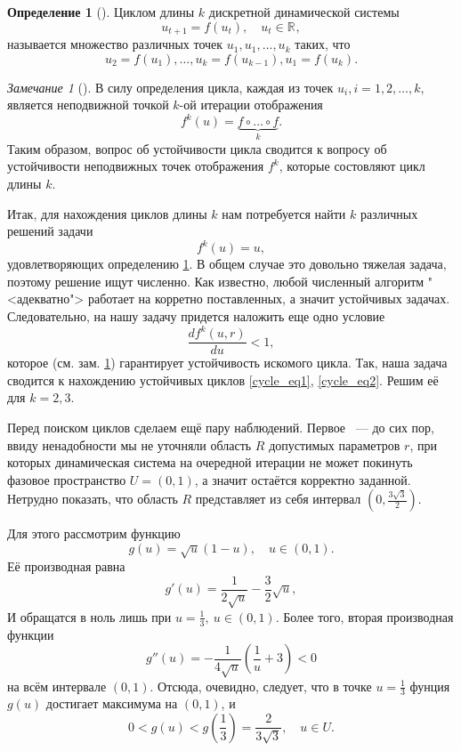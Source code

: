 \documentclass[oneside,final,12pt]{article}
\newcommand*\Rn  [1]{\mathbb{R}^{#1}}
\newcommand*\inter[2]{(#1,#2)}
\theoremstyle{plain}
\theoremstyle{remark}
\newtheorem*{remark}{Замечание}
\theoremstyle{definition}
\newtheorem{definition}{Определение}
\theoremstyle{plain}
\begin{document}
	\begin{definition}[\cite{DSMB}]\label{cycle}
		Циклом длины \(k\) дискретной динамической системы
		\[u_{t+1} = f(u_t), \quad u_t \in \Rn{},\]
		называется множество различных точек \(u_1, u_1, \ldots, u_k \) таких, что 
		\[u_2 = f(u_1), \ldots, u_k = f(u_{k-1}), u_1 = f(u_k).\] 
	\end{definition}
	\begin{remark}[\cite{DSMB}]\label{stable}
		В силу определения цикла, каждая из точек \(u_i, i = 1,2,\ldots,k\), является неподвижной точкой \(k\)-ой итерации отображения 
		\[f^k(u) = \underbrace{f \circ \ldots \circ f}_{k}.\]
		Таким образом, вопрос об устойчивости цикла сводится к вопросу об устойчивости неподвижных точек отображения \(f^k\), которые состовляют цикл длины \(k\).
	\end{remark}
	
	Итак, для нахождения циклов длины \(k\) нам потребуется найти \(k\) различных решений задачи
	\begin{equation} f^k(u) = u, \label{cycle_eq1} \end{equation}
	удовлетворяющих определению \ref{cycle}. В общем случае это довольно тяжелая задача, поэтому решение ищут численно. Как известно, любой численный алгоритм "<адекватно"> работает на корретно поставленных, а значит устойчивых задачах. Следовательно, на нашу задачу придется наложить еще одно условие
	\begin{equation} \frac{df^k(u,r)}{du} < 1,\label{cycle_eq2} \end{equation}
которое (см. зам. \ref{stable}) гарантирует устойчивость искомого цикла. Так, наша задача сводится к нахождению устойчивых циклов \eqref{cycle_eq1}, \eqref{cycle_eq2}. Решим её для \(k = 2,3\).

	\bigskip
	Перед поиском циклов сделаем ещё пару наблюдений. Первое ~--- до сих пор, ввиду ненадобности мы не уточняли область \(R\) допустимых параметров \(r\),  при которых динамическая система на очередной итерации не может покинуть фазовое пространство \(U = \inter{0}{1} \), а значит остаётся корректно заданной. Нетрудно показать, что область \(R\) представляет из себя интервал \(\left(0,\frac{3\sqrt{3}}{2}\right)\).

	Для этого рассмотрим функцию 
	\[g(u) = \sqrt{u}(1-u), \quad u \in \inter{0}{1}.\]
	Её производная равна
	\[g'(u) = \frac{1}{2\sqrt{u}} - \frac{3}{2}\sqrt{u},\]
	И обращатся в ноль лишь при \(u = \frac{1}{3}, \: u \in \inter{0}{1}\). Более того, вторая производная функции
	\[g''(u) = -\frac{1}{4\sqrt{u}}\left(\frac{1}{u}+3\right) < 0\] 
на всём интервале \(\inter{0}{1}\). Отсюда, очевидно, следует, что в точке \(u = \frac{1}{3}\) фунция \(g(u)\) достигает максимума на \(\inter{0}{1}\), и
	\[0<g(u)<g\left(\frac{1}{3}\right) = \frac{2}{3\sqrt{3}}, \quad u \in U.\]
\end{document}
